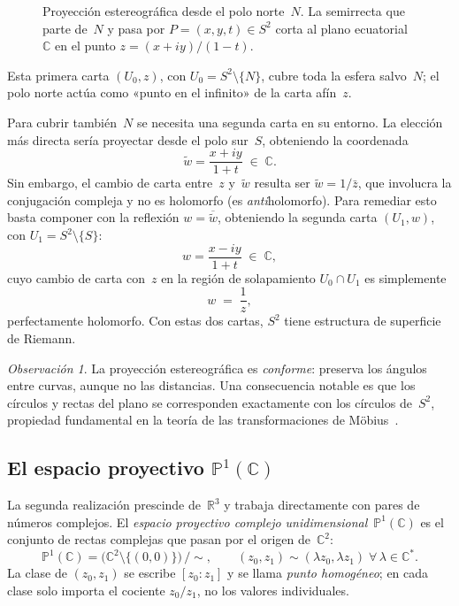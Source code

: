 \documentclass[11pt,a4paper]{article}
\theoremstyle{plain}
\theoremstyle{definition}
\theoremstyle{remark}
\newtheorem{observacion}[teorema]{Observación}
\newcommand{\C}{\mathbb{C}}
\newcommand{\R}{\mathbb{R}}
\newcommand{\Puno}{\mathbb{P}^1(\mathbb{C})}
\begin{document}
\begin{figure}[ht]
\caption{Proyección estereográfica desde el polo norte~$N$.
         La semirrecta que parte de~$N$ y pasa por $P=(x,y,t)\in S^2$
         corta al plano ecuatorial~$\mathbb{C}$ en el punto $z=(x+iy)/(1-t)$.}
\label{fig:stereo}
\end{figure}

Esta primera carta $(U_0, z)$, con $U_0 = S^2\setminus\{N\}$, cubre toda
la esfera salvo~$N$; el polo norte actúa como «punto en el infinito» de
la carta afín~$z$.

Para cubrir también~$N$ se necesita una segunda carta en su entorno.
La elección más directa sería proyectar desde el polo sur~$S$,
obteniendo la coordenada
\[
  \tilde{w} = \frac{x+iy}{1+t}\;\in\;\C.
\]
Sin embargo, el cambio de carta entre~$z$ y~$\tilde{w}$ resulta ser
$\tilde{w} = 1/\bar{z}$, que involucra la conjugación compleja y
no es holomorfo (es \emph{anti}holomorfo).
Para remediar esto basta componer con la reflexión $w=\overline{\tilde{w}}$,
obteniendo la segunda carta $(U_1, w)$, con $U_1 = S^2\setminus\{S\}$:
\[
  w = \frac{x-iy}{1+t}\;\in\;\C,
\]
cuyo cambio de carta con~$z$ en la región de solapamiento $U_0\cap U_1$ es
simplemente
\[
  w \;=\; \frac{1}{z},
\]
perfectamente holomorfo.
Con estas dos cartas, $S^2$ tiene estructura de superficie de Riemann.

\begin{observacion}
La proyección estereográfica es \emph{conforme}: preserva los ángulos
entre curvas, aunque no las distancias.
Una consecuencia notable es que los círculos y rectas del plano se
corresponden exactamente con los círculos de~$S^2$, propiedad fundamental
en la teoría de las transformaciones de Möbius~\cite{Needham1997}.
\end{observacion}

\subsection{El espacio proyectivo \texorpdfstring{$\Puno$}{P1(C)}}

La segunda realización prescinde de~$\R^3$ y trabaja directamente con
pares de números complejos.
El \emph{espacio proyectivo complejo unidimensional}~$\Puno$ es el conjunto
de rectas complejas que pasan por el origen de~$\C^2$:
\[
  \Puno = \bigl(\C^2\setminus\{(0,0)\}\bigr)\,\big/\!\sim,
  \qquad
  (z_0,z_1)\sim(\lambda z_0,\lambda z_1)\;\forall\,\lambda\in\C^*.
\]
La clase de $(z_0,z_1)$ se escribe $[z_0:z_1]$ y se llama \emph{punto
homogéneo}; en cada clase solo importa el cociente $z_0/z_1$,
no los valores individuales.
\end{document}
